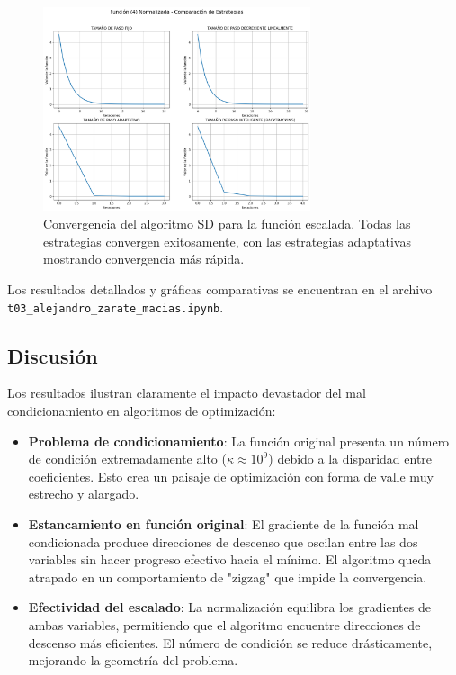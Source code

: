 \documentclass{article}
\begin{document}
\begin{figure}[H]
\centering
\includegraphics[width=0.7\textwidth]{images/9_funcion4_norm.png}
\caption{Convergencia del algoritmo SD para la función escalada. Todas las estrategias convergen exitosamente, con las estrategias adaptativas mostrando convergencia más rápida.}
\label{fig:ill_conditioned_scaled}
\end{figure}

Los resultados detallados y gráficas comparativas se encuentran en el archivo \texttt{t03\_alejandro\_zarate\_macias.ipynb}.

\subsection{Discusión}

Los resultados ilustran claramente el impacto devastador del mal condicionamiento en algoritmos de optimización:

\begin{itemize}
    \item \textbf{Problema de condicionamiento}: La función original presenta un número de condición extremadamente alto ($\kappa \approx 10^9$) debido a la disparidad entre coeficientes. Esto crea un paisaje de optimización con forma de valle muy estrecho y alargado.
    
    \item \textbf{Estancamiento en función original}: El gradiente de la función mal condicionada produce direcciones de descenso que oscilan entre las dos variables sin hacer progreso efectivo hacia el mínimo. El algoritmo queda atrapado en un comportamiento de "zigzag" que impide la convergencia.
    
    \item \textbf{Efectividad del escalado}: La normalización equilibra los gradientes de ambas variables, permitiendo que el algoritmo encuentre direcciones de descenso más eficientes. El número de condición se reduce drásticamente, mejorando la geometría del problema.
\end{itemize}
\end{document}
